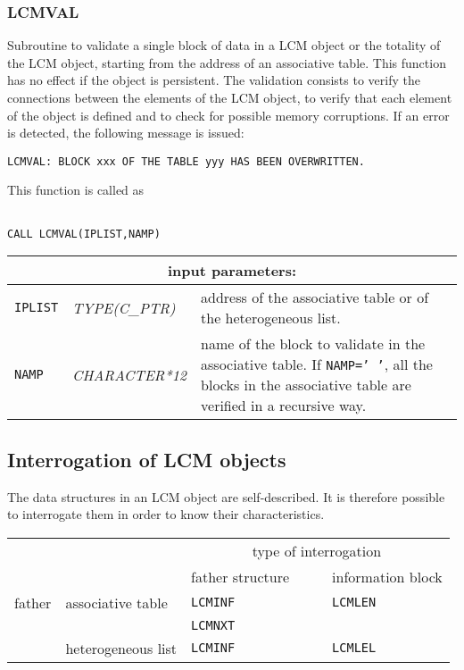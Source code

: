 \subsubsection{LCMVAL}

Subroutine to validate a single block of data in a LCM object or the totality of the LCM object,
starting from the address of an associative table. This function has no effect if the object is
persistent. The validation consists to verify the connections between the elements of the LCM
object, to verify that each element of the object is defined and to check for possible memory corruptions.
If an error is detected, the following message is issued:

\begin{verbatim}
LCMVAL: BLOCK xxx OF THE TABLE yyy HAS BEEN OVERWRITTEN.
\end{verbatim}

This function is called as

\begin{verbatim}

CALL LCMVAL(IPLIST,NAMP)
\end{verbatim}

\noindent
\begin{tabular}{|p{1.5cm}|p{3cm}|p{10cm}|}
\hline
\multicolumn{3}{|c|}{\bf input parameters:} \\
\hline
{\tt IPLIST} & {\it TYPE(C\_PTR)} & address of the associative table or of the heterogeneous list. \\
\hline
{\tt NAMP} & {\it CHARACTER*12} & name of the block to validate in the associative table. 
If {\tt NAMP='~'}, all the blocks in the associative table are verified in a recursive way. \\
\hline
\end{tabular}

\vskip 0.8cm

\subsection{Interrogation of LCM objects}

The data structures in an LCM object are self-described. It is therefore possible to
interrogate them in order to know their characteristics.

\vskip 0.4cm

\begin{center}
\begin{tabular}{|c|l|l|l|}
\cline{3-4}
\multicolumn{2}{c|}{} & \multicolumn{2}{c|}{type of interrogation} \\
\cline{3-4}
\multicolumn{2}{c|}{} & father structure~~~~  & information block \\
\hline
father & associative table & {\tt LCMINF} & {\tt LCMLEN} \\
       &                   & {\tt LCMNXT} &              \\
\cline{2-4}
       & heterogeneous list  & {\tt LCMINF} & {\tt LCMLEL} \\
\hline
\end{tabular}
\end{center}

